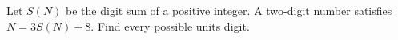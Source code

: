 Let $S(N)$ be the digit sum of a positive integer. A two-digit number satisfies $N=3S(N)+8$. Find every possible units digit.
